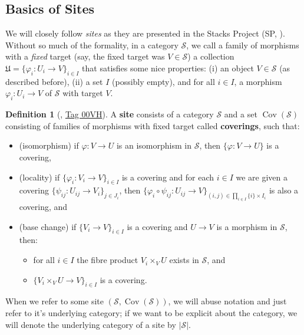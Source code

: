 \documentclass[oneside]{amsart}
\theoremstyle{definition}
\newtheorem{defi}{Definition}[section]
\DeclareMathOperator{\cov}{Cov}
\begin{document}
\subsection{Basics of Sites}
We will closely follow \textit{sites} as they are presented in the Stacks Project (SP, ). 
Without so much of the formality, in a category $\mathcal S$, we call a family of morphisms with a \textit{fixed} target (say, the fixed target was $V \in \mathcal S$) a collection $ \mathfrak U = \{ \varphi_i \colon U_i \to V \}_{i \in I}$ that satisfies some nice properties: (i) an object $V \in \mathcal S$ (as described before), (ii) a set $I$ (possibly empty), and for all $i \in I$, a morphism $\varphi_i \colon U_i \to V$ of $\mathcal S$ with target $V$.
\begin{defi}[, \href{https://stacks.math.columbia.edu/tag/00VH}{Tag 00VH}] A \textbf{site} consists of a category $\mathcal S$ and a set $\cov (\mathcal S)$ consisting of families of morphisms with fixed target called \textbf{coverings}, such that: 
\begin{itemize}
	\item [(1)] (isomorphism) if $\varphi \colon V \to U$ is an isomorphism in $\mathcal S$, then $\{\varphi \colon V \to U \}$ is a covering, 
	\item [(2)] (locality) if $\{ \varphi_i \colon V_i \to V \}_{i \in I}$ is a covering and for each $i \in I$ we are given a covering $\{ \psi _{ij} \colon U_{ij} \to V_i \}_{j \in J_i}$, then $\{ \varphi_i \circ \psi_{ij} \colon U_{ij} \to V \}_{(i,j) \in \prod _{i \in I} \{i \} \times I_i}$ is also a covering, and
	\item [(3)] (base change) if $\{V_i \to V \}_{i \in I}$ is a covering and $U \to V$ is a morphism in $\mathcal S$, then: \begin{itemize} \item[(i)] for all $i \in I$ the fibre product $V_i \times_V U$ exists in $\mathcal S$, and \item[(ii)] $\{V_i \times _V U \to V \}_{i \in I}$ is a covering.\end{itemize}
\end{itemize}
\end{defi} When we refer to some site $(\mathcal S, \cov(\mathcal S))$, we will abuse notation and just refer to it's underlying category; if we want to be explicit about the category, we will denote the underlying category of a site by $| \mathcal S |$. 
\end{document}
